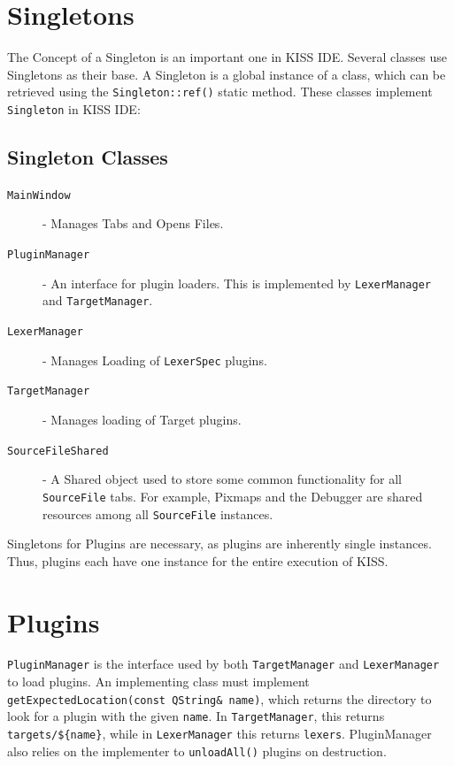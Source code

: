 \documentclass[7pt,letterpaper]{article}
\newcommand{\code}[1]{\texttt{#1}}
\begin{document}
	\section{Singletons}
	
	The Concept of a Singleton is an important one in KISS IDE. Several classes use Singletons as their base.
	A Singleton is a global instance of a class, which can be retrieved using the \code{Singleton::ref()} static method.
	These classes implement \code{Singleton} in KISS IDE:
	
	\subsection{Singleton Classes}
	
	\begin{description}
	\item[\code{MainWindow}] - Manages Tabs and Opens Files.
	\item[\code{PluginManager}] - An interface for plugin loaders. This is implemented by \code{LexerManager} and \code{TargetManager}.
	\item[\code{LexerManager}] - Manages Loading of \code{LexerSpec} plugins.
	\item[\code{TargetManager}] - Manages loading of Target plugins.
	\item[\code{SourceFileShared}] - A Shared object used to store some common functionality for all \code{SourceFile} tabs.
	For example, Pixmaps and the Debugger are shared resources among all \code{SourceFile} instances.
	\end{description}
	\singlespacing
	
	Singletons for Plugins are necessary, as plugins are inherently single instances. Thus, plugins each have one instance for the entire execution of KISS.
	

	\section{Plugins}
	
	\code{PluginManager} is the interface used by both \code{TargetManager} and \code{LexerManager} to load plugins.
	An implementing class must implement \code{getExpectedLocation(const QString\& name)}, which returns the directory to look
	for a plugin with the given \code{name}. In \code{TargetManager}, this returns \code{targets/\$\{name\}}, while in \code{LexerManager} this returns
	\code{lexers}. PluginManager also relies on the implementer to \code{unloadAll()} plugins on destruction.
	
\end{document}
